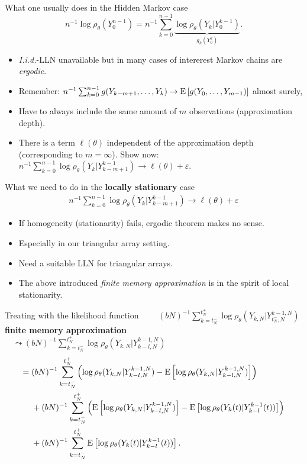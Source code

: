 \begin{frame}{What one usually does in the Hidden Markov case}
	\small 
	\[
	n^{-1} \log \rho_\theta(Y_0^{n-1}) = n^{-1} \sum_{k=0}^{n-1} \underbrace{\log \rho_\theta(Y_k | Y_0^{k-1})}_{g_k(Y_0^{k})}.
	\]
	\normalsize
	\begin{itemize}
	\item \textit{I.i.d.}-LLN unavailable but in many cases of intererest Markov chains are \textit{ergodic}. 
	\pause
	\item Remember: $n^{-1}\sum_{k=0}^{n-1} g(Y_{k-m+1},\ldots, Y_{k}) \to \E[g(Y_0, \ldots, Y_{m-1})]$ almost surely,
	\item Have to always include the same amount of $m$ observations (approximation depth). 
	\pause
	\item There is a term $\ell(\theta)$ independent of the approximation depth (corresponding to $m = \infty$). Show now:
	$n^{-1} \sum_{k=0}^{n-1} \log \rho_\theta(Y_k | Y_{k-m+1}^{k-1}) \longrightarrow \ell(\theta) + \varepsilon.$
	\end{itemize}
\end{frame}

\begin{frame}{What we need to do in the \textbf{locally stationary} case}
	\small
		\begin{align*}
		n^{-1} \sum_{k=0}^{n-1} \log \rho_\theta(Y_k | Y_{k-m+1}^{k-1}) \longrightarrow \ell(\theta) + \varepsilon
	\end{align*}
	\normalsize
	\begin{itemize}
		\item If homogeneity (stationarity) fails, ergodic theorem makes no sense. 
		\item Especially in our triangular array setting. 
		\pause
		\item Need a suitable LLN for triangular arrays. 
		\item The above introduced \textit{finite memory approximation} is in the spirit of local stationarity. 
	\end{itemize}
\end{frame}

\begin{frame}{Treating with the likelihood function}
	$\qquad (bN)^{-1} \sum_{k=t_N^-}^{t_N^+} \log \rho_\theta(Y_{k,N}|Y_{t_N^-,N}^{k-1,N})$ \pause \textbf{finite memory approximation} \\[0.4cm]  $\quad  \leadsto (bN)^{-1} \sum_{k=t_N^-}^{t_N^+} \log \rho_\theta(Y_{k,N}|Y_{k-l,N}^{k-1,N})$ \pause \begin{align*} =&\; (bN)^{-1} \sum_{k=t_N^-}^{t_N^+} \left(\log \rho_\theta(Y_{k,N}|Y_{k-l,N}^{k-1,N})-  \E[\log \rho_\theta(Y_{k,N}|Y_{k-l,N}^{k-1,N})]\right) \\ &\; + (bN)^{-1} \sum_{k=t_N^-}^{t_N^+} \left(\E[\log \rho_\theta(Y_{k,N}|Y_{k-l,N}^{k-1,N})]-  \E[\log \rho_\theta(Y_{k}(t)|Y_{k-l}^{k-1}(t))]\right) \\ &\; + (bN)^{-1} \sum_{k=t_N^-}^{t_N^+} \E[\log \rho_\theta(Y_{k}(t)|Y_{k-l}^{k-1}(t))].
	\end{align*}
\end{frame}

